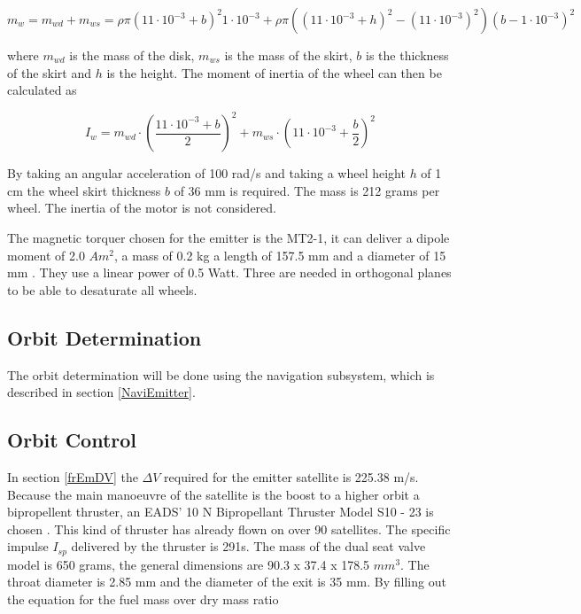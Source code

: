 \begin{equation}
m_w = m_{wd} + m_{ws} = \rho \pi \left(11\cdot 10^{-3}+b\right)^2 1\cdot 10^{-3} + \rho \pi \left(\left(11\cdot 10^{-3}+h\right)^2 - \left(11\cdot 10^{-3}\right)^2\right)\left(b-1\cdot 10^{-3}\right)^2
\end{equation}

where $m_{wd}$ is the mass of the disk, $m_{ws}$ is the mass of the skirt, $b$ is the thickness of the skirt and $h$ is the height. The moment of inertia of the wheel can then be calculated as

\begin{equation}
I_w =  m_{wd} \cdot \left(\frac{11\cdot 10^{-3}+b}{2}\right)^2  + m_{ws} \cdot \left(11\cdot 10^{-3}+\frac{b}{2}\right)^2
\end{equation}

By taking an angular acceleration of 100 rad/s and taking a wheel height $h$ of 1 cm the wheel skirt thickness $b$ of 36 mm is required. The mass is 212 grams per wheel. The inertia of the motor is not considered.

The magnetic torquer chosen for the emitter is the MT2-1, it can deliver a dipole moment of 2.0 $Am^2$, a mass of 0.2 kg a length of 157.5 mm and a diameter of 15 mm \cite{zarm}. They use a linear power of 0.5 Watt. Three are needed in orthogonal planes to be able to desaturate all wheels.

\subsection{Orbit Determination}
\label{ss:emDDods}
The orbit determination will be done using the navigation subsystem, which is described in section \ref{NaviEmitter}.

\subsection{Orbit Control}
\label{ss:emDDocs}
In section \ref{frEmDV} the $\Delta V$ required for the emitter satellite is 225.38 m/s. Because the main manoeuvre of the satellite is the boost to a higher orbit a bipropellent thruster, an EADS' 10 N Bipropellant Thruster Model S10 - 23 is chosen \cite{10Nthruster}. This kind of thruster has already flown on over 90 satellites. The specific impulse $I_{sp}$ delivered by the thruster is 291s. The mass of the dual seat valve model is 650 grams, the general dimensions are 90.3 x 37.4 x 178.5 $mm^3$. The throat diameter is 2.85 mm and the diameter of the exit is 35 mm. By filling out the equation for the fuel mass over dry mass ratio

